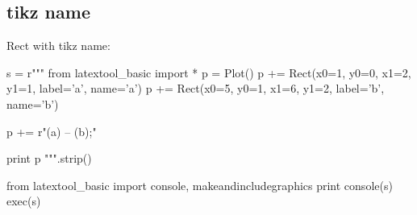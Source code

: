 \newpage
\subsection{tikz name}
Rect with tikz name:
\begin{python}
s = r"""
from latextool_basic import *
p = Plot()
p += Rect(x0=1, y0=0, x1=2, y1=1, label='a', name='a')
p += Rect(x0=5, y0=1, x1=6, y1=2, label='b', name='b')

p += r"\draw[->,line width=2] (a) -- (b);"

print p
""".strip()

from latextool_basic import console, makeandincludegraphics
print console(s)
exec(s)
\end{python}
